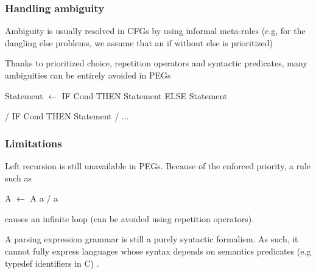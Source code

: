 \begin{frame}
	\frametitle{Handling ambiguity}

	\begin{block}{}
	 Ambiguity is usually resolved in CFGs by using informal meta-rules (e.g, for the dangling else problems, we assume that an if without else is prioritized)
\end{block} 
	 \begin{block}{}
	 	Thanks to prioritized choice, repetition operators and syntactic predicates, many ambiguities can  be entirely avoided in PEGs
	 \end{block}
 	\begin{center}
 		Statement $\leftarrow$ IF Cond THEN  Statement ELSE Statement 
 		
 		/	IF Cond THEN Statement  / 	$\dots$	
 	\end{center}
\end{frame}

\begin{frame}
	\frametitle{Limitations}
	\begin{block}{}
		Left recursion is still unavailable in PEGs. Because of the enforced priority,  a rule such as 
		\begin{center}A $\leftarrow$ A a / a\end{center}
		causes an infinite loop (can be avoided using repetition operators).
		
	\end{block}
	\begin{block}{}
		A parsing expression grammar is still a purely syntactic formalism. As such, it cannot fully express languages whose syntax depends on semantics predicates (e.g typedef identifiers in C) .  
	\end{block}
\end{frame}